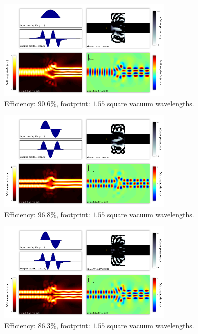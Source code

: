 \documentclass[letterpaper,10pt]{article}
\begin{document}
\begin{appendix}
\begin{figure}[htb]
    \centering
    \includegraphics[width=0.75\textwidth]{8}
    \caption{
        Efficiency: $90.6\%$,
        footprint: $1.55$ square vacuum wavelengths.
        }
\end{figure}


\begin{figure}[htb]
    \centering
    \includegraphics[width=0.75\textwidth]{9}
    \caption{
        Efficiency: $96.8\%$,
        footprint: $1.55$ square vacuum wavelengths.
        }
\end{figure}


\begin{figure}[htb]
    \centering
    \includegraphics[width=0.75\textwidth]{10}
    \caption{
        Efficiency: $86.3\%$,
        footprint: $1.55$ square vacuum wavelengths.
        }
\end{figure}



\end{appendix}
\end{document}
